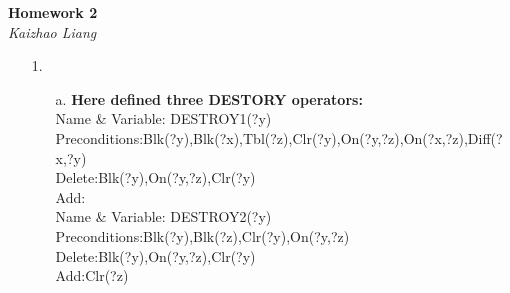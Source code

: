 \documentclass{article}
\begin{document}
\begin{titlepage}
   \begin{center}
      \Large\textbf{Homework 2}\\
      \large\textit{Kaizhao Liang}
   \end{center}
   \begin{enumerate}
   	\item[1.]
   	\begin{enumerate}
   		\item[a.] \textbf{Here defined three DESTORY operators:}\\
   				  Name \& Variable: DESTROY1(?y)\\
   				  Preconditions:Blk(?y),Blk(?x),Tbl(?z),Clr(?y),On(?y,?z),On(?x,?z),Diff(?x,?y)\\
   				  Delete:Blk(?y),On(?y,?z),Clr(?y)\\
   				  Add:\\

   				  Name \& Variable: DESTROY2(?y)\\
   				  Preconditions:Blk(?y),Blk(?z),Clr(?y),On(?y,?z)\\
   				  Delete:Blk(?y),On(?y,?z),Clr(?y)\\
   				  Add:Clr(?z)\\


\end{enumerate}
\end{enumerate}
\end{titlepage}
\end{document}
